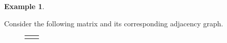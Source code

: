 \documentclass[preprint,12pt]{elsarticle}
\theoremstyle{definition}
\newtheorem{example}[thm]{Example}
\theoremstyle{remark}
\begin{document}
\begin{example}\label{ex:1}

Consider the following matrix and its corresponding adjacency graph.

\begin{figure}[h]
\begin{tabular}{cc}
\begin{minipage}[b]{.47\textwidth}

\end{minipage}
\end{tabular}
\end{figure}
\end{example}
\end{document}
